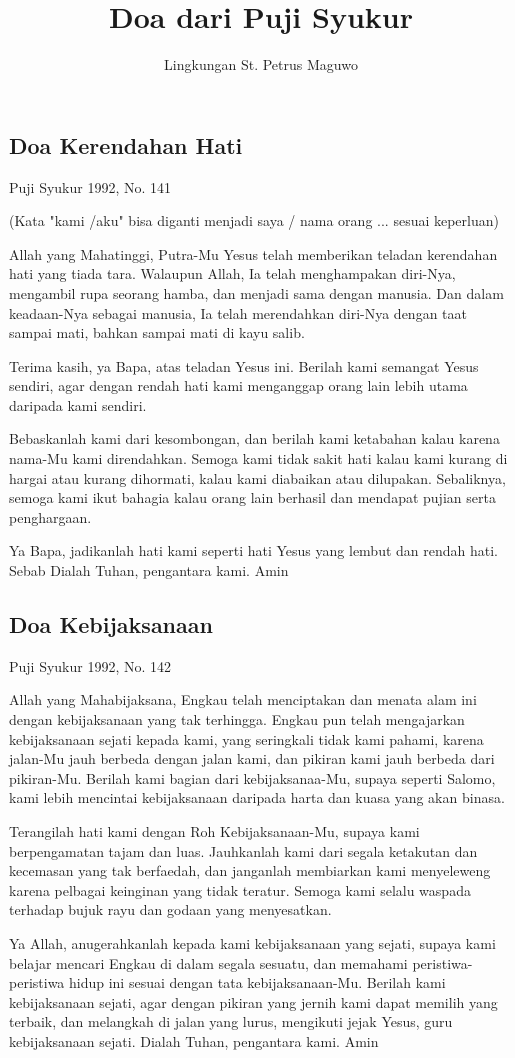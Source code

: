 \documentclass[titlepage,11pt,openany]{scrbook}
\author{Lingkungan St. Petrus Maguwo}
\title{Doa dari Puji Syukur}
\newcommand{\ps}[2][\numexpr\value{subsection}+1\relax]{%
\setcounter{subsection}{\numexpr#1-1\relax}
\subsection{#2}
}
\begin{document}
\thispagestyle{empty}
\tableofcontents
\ps[141]{Doa Kerendahan Hati}
Puji Syukur 1992, No. 141

(Kata "kami /aku" bisa diganti menjadi saya / nama orang ... sesuai keperluan) 

Allah yang Mahatinggi, Putra-Mu Yesus telah memberikan teladan kerendahan hati yang tiada tara. Walaupun Allah, Ia telah menghampakan diri-Nya, mengambil rupa seorang hamba, dan menjadi sama dengan manusia. Dan dalam keadaan-Nya sebagai manusia, Ia telah merendahkan diri-Nya dengan taat sampai mati, bahkan sampai mati di kayu salib.

Terima kasih, ya Bapa, atas teladan Yesus ini. Berilah kami semangat Yesus sendiri, agar dengan rendah hati kami menganggap orang lain lebih utama daripada kami sendiri.

Bebaskanlah kami dari kesombongan, dan berilah kami ketabahan kalau karena nama-Mu kami direndahkan. Semoga kami tidak sakit hati kalau kami kurang di hargai atau kurang dihormati, kalau kami diabaikan atau dilupakan. Sebaliknya, semoga kami ikut bahagia kalau orang lain berhasil dan mendapat pujian serta penghargaan.

Ya Bapa, jadikanlah hati kami seperti hati Yesus yang lembut dan rendah hati. Sebab Dialah Tuhan, pengantara kami. Amin

 


\ps{Doa Kebijaksanaan}
Puji Syukur 1992, No. 142

Allah yang Mahabijaksana, Engkau telah menciptakan dan menata alam ini dengan kebijaksanaan yang tak terhingga. Engkau pun telah mengajarkan kebijaksanaan sejati kepada kami, yang seringkali tidak kami pahami, karena jalan-Mu jauh berbeda dengan jalan kami, dan pikiran kami jauh berbeda dari pikiran-Mu. Berilah kami bagian dari kebijaksanaa-Mu, supaya seperti Salomo, kami lebih mencintai kebijaksanaan daripada harta dan kuasa yang akan binasa.

Terangilah hati kami dengan Roh Kebijaksanaan-Mu, supaya kami berpengamatan tajam dan luas. Jauhkanlah kami dari segala ketakutan dan kecemasan yang tak berfaedah, dan janganlah membiarkan kami menyeleweng karena pelbagai keinginan yang tidak teratur. Semoga kami selalu waspada terhadap bujuk rayu dan godaan yang menyesatkan.

Ya Allah, anugerahkanlah kepada kami kebijaksanaan yang sejati, supaya kami belajar mencari Engkau di dalam segala sesuatu, dan memahami peristiwa-peristiwa hidup ini sesuai dengan tata kebijaksanaan-Mu. Berilah kami kebijaksanaan sejati, agar dengan pikiran yang jernih kami dapat memilih yang terbaik, dan melangkah di jalan yang lurus, mengikuti jejak Yesus, guru kebijaksanaan sejati. Dialah Tuhan, pengantara kami. Amin
\end{document}
